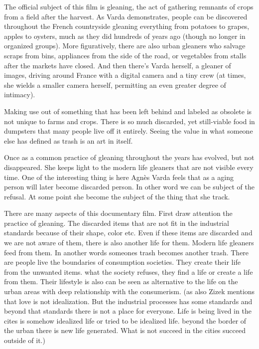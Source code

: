\documentclass[12pt]{article}
\begin{document}
The official subject of this film is gleaning, the act of gathering remnants of crops from a field after the harvest. As Varda demonstrates, people can be discovered throughout the French countryside gleaning everything from potatoes to grapes, apples to oysters, much as they did hundreds of years ago (though no longer in organized groups). More figuratively, there are also urban gleaners who salvage scraps from bins, appliances from the side of the road, or vegetables from stalls after the markets have closed. And then there’s Varda herself, a gleaner of images, driving around France with a digital camera and a tiny crew (at times, she wields a smaller camera herself, permitting an even greater degree of intimacy).

Making use out of something that has been left behind and labeled as obsolete is not unique to farms and crops. There is so much discarded, yet still-viable food in dumpsters that many people live off it entirely. Seeing the value in what someone else has defined as trash is an art in itself.

Once as a common practice of gleaning throughout the years has evolved, but not disappeared. She keeps light to the modern life gleaners that are not visible every time. One of the interesting thing is here Agnès Varda feels that as a aging person will later become discarded person. In other word we can be subject of the refusal. At some point she become the subject of the thing that she track. 

There are many aspects of this documentary film. First draw attention the practice of gleaning. The discarded items that are not fit in the industrial standards because of their shape, color etc. Even if these items are discarded and we are not aware of them, there is also another life for them. Modern life gleaners feed from them. In another words someones trash becomes another trash. There are people live the boundaries of consumption societies. They create their life from the unwanted items. what the society refuses, they find a life or create a life from them. Their lifestyle is also can be seen as alternative to the life on the urban areas with deep relationship with the consumerism. (as also Zizek mentions that love is not idealization. But the industrial processes has some standards and beyond that standards there is not a place for everyone. Life is being lived in the cites is somehow idealized life or tried to be idealized life. beyond the border of the urban there is new life generated. What is not succeed in the cities succeed outside of it.)
\end{document}
